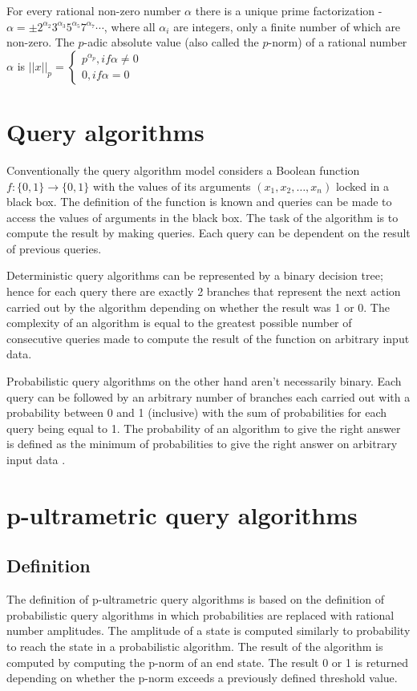 \documentclass{llncs}
\begin{document}
For every rational non-zero number $\alpha$ there is a unique prime factorization - $\alpha = \pm 2^{\alpha_2}3^{\alpha_3}5^{\alpha_5}7^{\alpha_7} \cdots$, where all $\alpha_i$ are integers, only a finite number of which are non-zero. The $p$-adic absolute value (also called the $p$-norm) of a rational number $\alpha$ is 
$||x||_p = \begin{cases}
p^{\alpha_p}, if \alpha \neq 0 \\
0, if \alpha = 0
\end{cases} $

\section{Query algorithms}
Conventionally the query algorithm model considers a Boolean function $f:\{0,1\}\rightarrow\{0,1\}$ with the values of its arguments $(x_1,x_2,\ldots,x_n)$ locked in a black box. The definition of the function is known and queries can be made to access the values of arguments in the black box. The task of the algorithm is to compute the result by making queries. Each query can be dependent on the result of previous queries.

Deterministic query algorithms can be represented by a binary decision tree; hence for each query there are exactly 2 branches that represent the next action carried out by the algorithm depending on whether the result was 1 or 0. The complexity of an algorithm is equal to the greatest possible number of consecutive queries made to compute the result of the function on arbitrary input data.

Probabilistic query algorithms on the other hand aren't necessarily binary. Each query can be followed by an arbitrary number of branches each carried out with a probability between 0 and 1 (inclusive) with the sum of probabilities for each query being equal to 1. The probability of an algorithm to give the right answer is defined as the minimum of probabilities to give the right answer on arbitrary input data \cite{Buh02} \cite{Vas10}.

\section{p-ultrametric query algorithms}
\subsection{Definition}
The definition of p-ultrametric query algorithms is based on the definition of probabilistic query algorithms in which probabilities are replaced with rational number amplitudes. The amplitude of a state is computed similarly to probability to reach the state in a probabilistic algorithm. The result of the algorithm is computed by computing the p-norm of an end state. The result 0 or 1 is returned depending on whether the p-norm exceeds a previously defined threshold value.
\end{document}
